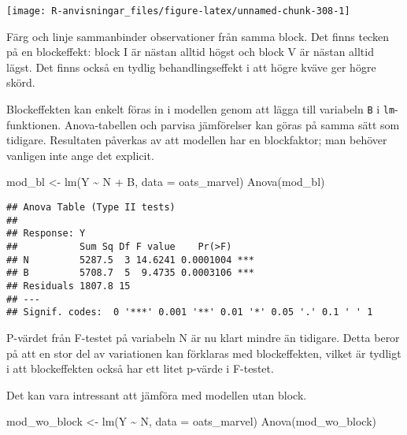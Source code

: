 \documentclass[
]{book}
\newenvironment{Shaded}{\begin{snugshade}}{\end{snugshade}}
\newcommand{\AttributeTok}[1]{\textcolor[rgb]{0.77,0.63,0.00}{#1}}
\newcommand{\FunctionTok}[1]{\textcolor[rgb]{0.00,0.00,0.00}{#1}}
\newcommand{\NormalTok}[1]{#1}
\newcommand{\OtherTok}[1]{\textcolor[rgb]{0.56,0.35,0.01}{#1}}
\newcommand{\SpecialCharTok}[1]{\textcolor[rgb]{0.00,0.00,0.00}{#1}}
\theoremstyle{definition}
\theoremstyle{definition}
\theoremstyle{definition}
\theoremstyle{definition}
\theoremstyle{remark}
\begin{document}
\begin{center}\texttt{[image: R-anvisningar\_files/figure-latex/unnamed-chunk-308-1]} \end{center}

Färg och linje sammanbinder observationer från samma block. Det finns tecken på en blockeffekt: block I är nästan alltid högst och block V är nästan alltid lägst. Det finns också en tydlig behandlingseffekt i att högre kväve ger högre skörd.

Blockeffekten kan enkelt föras in i modellen genom att lägga till variabeln \texttt{B} i \texttt{lm}-funktionen. Anova-tabellen och parvisa jämförelser kan göras på samma sätt som tidigare. Resultaten påverkas av att modellen har en blockfaktor; man behöver vanligen inte ange det explicit.

\begin{Shaded}
\begin{Highlighting}[]
\NormalTok{mod\_bl }\OtherTok{\textless{}{-}} \FunctionTok{lm}\NormalTok{(Y }\SpecialCharTok{\textasciitilde{}}\NormalTok{ N }\SpecialCharTok{+}\NormalTok{ B, }\AttributeTok{data =}\NormalTok{ oats\_marvel)}
\FunctionTok{Anova}\NormalTok{(mod\_bl)}
\end{Highlighting}
\end{Shaded}

\begin{verbatim}
## Anova Table (Type II tests)
## 
## Response: Y
##           Sum Sq Df F value    Pr(>F)    
## N         5287.5  3 14.6241 0.0001004 ***
## B         5708.7  5  9.4735 0.0003106 ***
## Residuals 1807.8 15                      
## ---
## Signif. codes:  0 '***' 0.001 '**' 0.01 '*' 0.05 '.' 0.1 ' ' 1
\end{verbatim}

P-värdet från F-testet på variabeln N är nu klart mindre än tidigare. Detta beror på att en stor del av variationen kan förklaras med blockeffekten, vilket är tydligt i att blockeffekten också har ett litet p-värde i F-testet.

Det kan vara intressant att jämföra med modellen utan block.

\begin{Shaded}
\begin{Highlighting}[]
\NormalTok{mod\_wo\_block }\OtherTok{\textless{}{-}} \FunctionTok{lm}\NormalTok{(Y }\SpecialCharTok{\textasciitilde{}}\NormalTok{ N, }\AttributeTok{data =}\NormalTok{ oats\_marvel)}
\FunctionTok{Anova}\NormalTok{(mod\_wo\_block)}
\end{Highlighting}
\end{Shaded}
\end{document}
